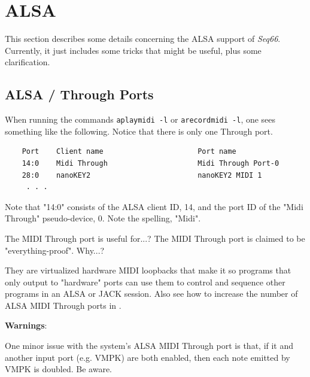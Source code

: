 %
%
%

\section{ALSA}
\label{sec:alsa}

   This section describes some details concerning the ALSA support of
   \textsl{Seq66}.
   Currently, it just includes some tricks that might be useful, plus some
   clarification.

\subsection{ALSA / Through Ports}
\label{subsec:alsa_through_ports}

   When running the commands \texttt{aplaymidi -l} or \texttt{arecordmidi -l},
   one sees something like the following.
   Notice that there is only one Through port.

   \begin{verbatim}
    Port    Client name                      Port name
    14:0    Midi Through                     Midi Through Port-0
    28:0    nanoKEY2                         nanoKEY2 MIDI 1
     . . .
   \end{verbatim}

   Note that "14:0" consists of the ALSA client ID, 14, and the port ID of the
   "Midi Through" pseudo-device, 0. Note the spelling, "Midi".

   The MIDI Through port is useful for...?
   The MIDI Through port is claimed to be "everything-proof". Why...?

   They are virtualized hardware MIDI loopbacks that make it so
   programs that only output to "hardware" ports can use them
   to control and sequence other programs in an ALSA or JACK session.
   Also see how to increase the number of ALSA MIDI Through ports in
   \cite{alsathru}.

   \textbf{Warnings}:

   One minor issue with the system's ALSA MIDI Through port is that, if it and
   another input port (e.g. VMPK) are both enabled, then each note emitted by
   VMPK is doubled. Be aware.

